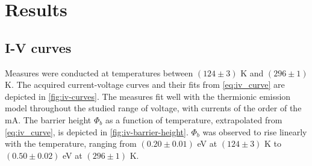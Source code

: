 \section{Results}
\subsection{I-V curves} \label{sec:results_iv}
Measures were conducted at temperatures between $(124 \pm 3)$ K and $(296\pm1)$ K. 
The acquired current-voltage curves and their fits from \autoref{eq:iv_curve} are depicted in \autoref{fig:iv-curves}.
The measures fit well with the thermionic emission model throughout the studied range of voltage, with currents of the order of the mA.
The barrier height $\Phi_b$ as a function of temperature, extrapolated from \autoref{eq:iv_curve}, is depicted in \autoref{fig:iv-barrier-height}.
$\Phi_b$ was observed to rise linearly with the temperature, ranging from $(0.20 \pm 0.01)$ eV at $(124 \pm 3)$ K to $(0.50 \pm 0.02)$ eV at $(296 \pm 1)$ K.


